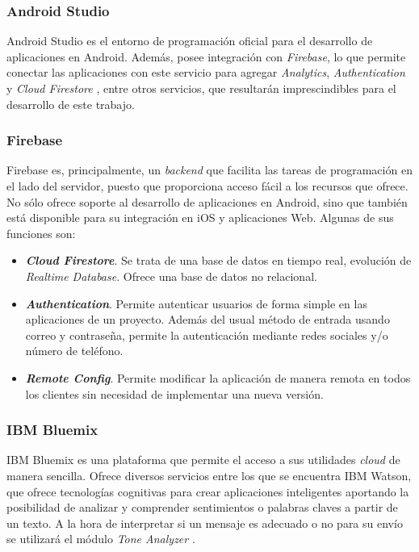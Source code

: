 \documentclass{pre-tfg}
\begin{document}
\subsubsection*{Android Studio}
Android Studio \cite{AndroidStudio} es el entorno de programación oficial para el desarrollo de aplicaciones en Android. Además, posee integración con \textit{Firebase}, lo que permite conectar las aplicaciones con este servicio para agregar \textit{Analytics}, \textit{Authentication} y \textit{Cloud Firestore }, entre otros servicios, que resultarán imprescindibles para el desarrollo de este trabajo.

\subsubsection*{Firebase}
Firebase \cite{GooFirebase} es, principalmente, un \textit{backend} que facilita las tareas de programación en el lado del servidor, puesto que proporciona acceso fácil a los recursos que ofrece. No sólo ofrece soporte al desarrollo de aplicaciones en Android, sino que también está disponible para su integración en iOS y aplicaciones Web. Algunas de sus funciones son:

\begin{itemize}
	\item \textbf{\textit{Cloud Firestore}}. Se trata de una base de datos en tiempo real, evolución de \textit{Realtime Database}. Ofrece una base de datos no relacional.
	\item \textbf{\textit{Authentication}}. Permite autenticar usuarios de forma simple en las aplicaciones de un proyecto. Además del usual método de entrada usando correo y contraseña, permite la autenticación mediante redes sociales y/o número de teléfono.
	\item \textbf{\textit{Remote Config}}. Permite modificar la aplicación de manera remota en todos los clientes sin necesidad de implementar una nueva versión.
\end{itemize}

\clearpage

\subsubsection*{IBM Bluemix}
IBM Bluemix es una plataforma que permite el acceso a sus utilidades \textit{cloud} de manera sencilla. Ofrece diversos servicios entre los que se encuentra IBM Watson, que ofrece tecnologías cognitivas para crear aplicaciones inteligentes aportando la posibilidad de analizar y comprender sentimientos o palabras claves a partir de un texto. A la hora de interpretar si un mensaje es adecuado o no para su envío se utilizará el módulo \textit{Tone Analyzer} \cite{IBM}.
\end{document}
